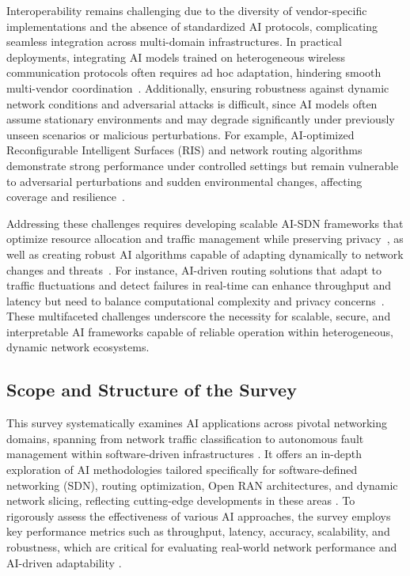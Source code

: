 \documentclass[sigconf]{acmart}
\begin{document}
Interoperability remains challenging due to the diversity of vendor-specific implementations and the absence of standardized AI protocols, complicating seamless integration across multi-domain infrastructures. In practical deployments, integrating AI models trained on heterogeneous wireless communication protocols often requires ad hoc adaptation, hindering smooth multi-vendor coordination~\cite{ref30,ref48}. Additionally, ensuring robustness against dynamic network conditions and adversarial attacks is difficult, since AI models often assume stationary environments and may degrade significantly under previously unseen scenarios or malicious perturbations. For example, AI-optimized Reconfigurable Intelligent Surfaces (RIS) and network routing algorithms demonstrate strong performance under controlled settings but remain vulnerable to adversarial perturbations and sudden environmental changes, affecting coverage and resilience~\cite{ref49,ref50,ref53}.

Addressing these challenges requires developing scalable AI-SDN frameworks that optimize resource allocation and traffic management while preserving privacy~\cite{ref52}, as well as creating robust AI algorithms capable of adapting dynamically to network changes and threats~\cite{ref49,ref50,ref53}. For instance, AI-driven routing solutions that adapt to traffic fluctuations and detect failures in real-time can enhance throughput and latency but need to balance computational complexity and privacy concerns~\cite{ref53}. These multifaceted challenges underscore the necessity for scalable, secure, and interpretable AI frameworks capable of reliable operation within heterogeneous, dynamic network ecosystems.

\subsection{Scope and Structure of the Survey}

This survey systematically examines AI applications across pivotal networking domains, spanning from network traffic classification to autonomous fault management within software-driven infrastructures \cite{ref31,ref32}. It offers an in-depth exploration of AI methodologies tailored specifically for software-defined networking (SDN), routing optimization, Open RAN architectures, and dynamic network slicing, reflecting cutting-edge developments in these areas \cite{ref33,ref34,ref35}. To rigorously assess the effectiveness of various AI approaches, the survey employs key performance metrics such as throughput, latency, accuracy, scalability, and robustness, which are critical for evaluating real-world network performance and AI-driven adaptability \cite{ref51,ref52}.
\end{document}
